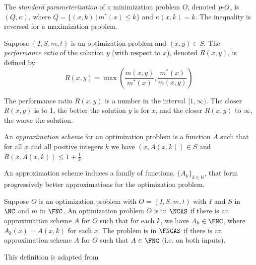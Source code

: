 \documentclass{article}
\newcommand{\dash}{\textnormal{-}}
\begin{document}
\begin{definition}
  The \emph{standard parameterization} of a minimization problem $O$, denoted $p\dash{O}$, is $(Q, \kappa)$, where $Q = \{ (x, k) \, | \, m^*(x) \leq k \}$ and $\kappa(x, k) = k$.
  The inequality is reversed for a maximization problem.
\end{definition}

\begin{definition}
  Suppose $(I, S, m, t)$ is an optimization problem and $(x, y) \in S$.
  The \emph{performance ratio} of the solution $y$ (with respect to $x$), denoted $R(x, y)$, is defined by
  \[
  R(x, y) = \max \left(\frac{m(x, y)}{m^*(x)}, \frac{m^*(x)}{m(x, y)}\right)
  \]
\end{definition}

The performance ratio $R(x, y)$ is a number in the interval $[1, \infty)$.
The closer $R(x, y)$ is to 1, the better the solution $y$ is for $x$, and the closer $R(x, y)$ to $\infty$, the worse the solution.

\begin{definition}
  An \emph{approximation scheme} for an optimization problem is a function $A$ such that for all $x$ and all positive integers $k$ we have $(x, A(x, k)) \in S$ and $R(x, A(x, k)) \leq 1 + \frac{1}{k}$.
\end{definition}

An approximation scheme induces a family of functions, $\{A_k\}_{k \in \mathbb{N}}$, that form progressively better approximations for the optimization problem.


\begin{definition}
  Suppose $O$ is an optimization problem with $O = (I, S, m, t)$ with $I$ and $S$ in $\NC$ and $m$ in $\FNC$.
  An optimization problem $O$ is in $\NCAS$ if there is an approximation scheme $A$ for $O$ such that for each $k$, we have $A_k \in \FNC$, where $A_k(x) = A(x, k)$ for each $x$.
  The problem is in $\FNCAS$ if there is an approximation scheme $A$ for $O$ such that $A \in \FNC$ (i.e. on both inputs).
\end{definition}

This definition is adapted from \autocite[Definition~1.31]{fg06}
\end{document}
